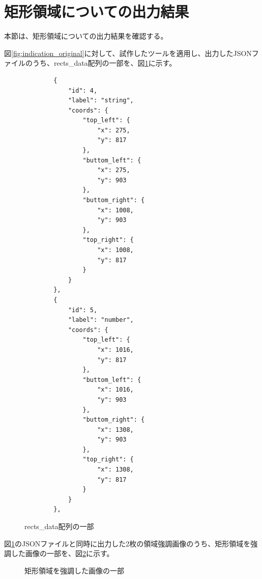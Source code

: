 \section{矩形領域についての出力結果}\label{sec:result_rect}
本節は、矩形領域についての出力結果を確認する。

図\ref{fig:indication_original}に対して、試作したツールを適用し、出力したJSONファイルのうち、rects\_data配列の一部を、図\ref{fig:rects_data_json}に示す。

\lstset{language=}
\begin{figure}[tp]
    \begin{lstlisting}
        {
            "id": 4,
            "label": "string",
            "coords": {
                "top_left": {
                    "x": 275,
                    "y": 817
                },
                "buttom_left": {
                    "x": 275,
                    "y": 903
                },
                "buttom_right": {
                    "x": 1008,
                    "y": 903
                },
                "top_right": {
                    "x": 1008,
                    "y": 817
                }
            }
        },
        {
            "id": 5,
            "label": "number",
            "coords": {
                "top_left": {
                    "x": 1016,
                    "y": 817
                },
                "buttom_left": {
                    "x": 1016,
                    "y": 903
                },
                "buttom_right": {
                    "x": 1308,
                    "y": 903
                },
                "top_right": {
                    "x": 1308,
                    "y": 817
                }
            }
        },
    \end{lstlisting}
    \caption{rects\_data配列の一部}\label{fig:rects_data_json}
\end{figure}

図\ref{fig:rects_data_json}のJSONファイルと同時に出力した2枚の領域強調画像のうち、矩形領域を強調した画像の一部を、図\ref{fig:highlighted_rects_part}に示す。

\begin{figure}[tp]
    \begin{center}
        \caption{矩形領域を強調した画像の一部}
        \label{fig:highlighted_rects_part}
    \end{center}
\end{figure}

